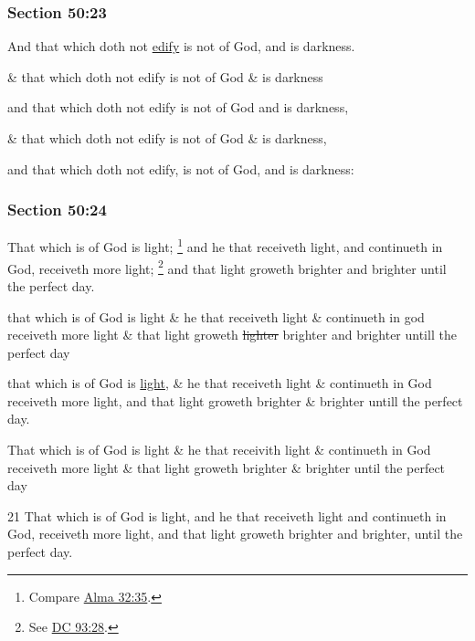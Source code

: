 	\subsubsection{Section 50:23} %
		\label{DC50-23}

		And that which doth not \hyperref[EDIFICATION]{edify} is not of God, and is darkness.

		\begin{framed}
		\scriptsize
			\begin{compactdesc}
				\item[JSP] \& that which doth not edify is not of God \& is darkness
				\item[Gilbert] and that which doth not edify is not of God and is darkness,
				\item[Hyde and Smith] \& that which doth not edify is not of God \& is darkness,
				\item[BC] and that which doth not edify, is not of God, and is darkness:
			\end{compactdesc}
		\end{framed}

	\subsubsection{Section 50:24} %
		\label{DC50-24}

		That which is of God is light;%
			\footnote{%
				Compare \hyperref[ALMA-32-35]{Alma 32:35}.
				}
		and he that receiveth light, and continueth in God, receiveth more light;%
			\footnote{%
				See \hyperref[DC93-28]{DC 93:28}.
				}
		and that light groweth brighter and brighter until the perfect day.

		\begin{framed}
		\scriptsize
			\begin{compactdesc}
				\item[JSP] that which is of God is light \& he that receiveth light \& continueth in god receiveth more light \& that light groweth \sout{lighter} brighter and brighter untill the perfect day
				\item[Gilbert] that which is of God is \uline{light}, \& he that receiveth light \& continueth in God receiveth more light, and that light groweth brighter \& brighter untill the perfect day.
				\item[Hyde and Smith] That which is of God is light \& he that receivith light \& continueth in God receiveth more light \& that light groweth brighter \& brighter until the perfect day
				\item[BC] 21 That which is of God is light, and he that receiveth light and continueth in God, receiveth more light, and that light groweth brighter and brighter, until the perfect day.
			\end{compactdesc}
		\end{framed}

